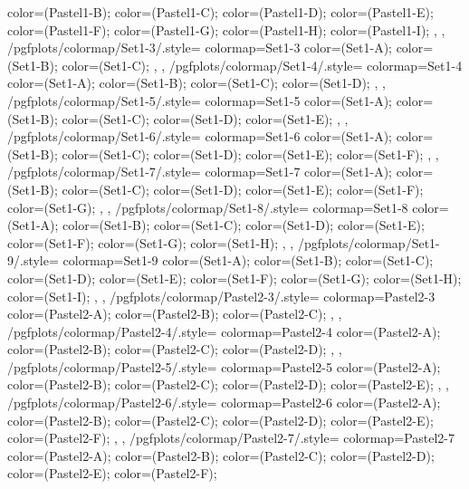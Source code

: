 {{{      color=(Pastel1-B);
      color=(Pastel1-C);
      color=(Pastel1-D);
      color=(Pastel1-E);
      color=(Pastel1-F);
      color=(Pastel1-G);
      color=(Pastel1-H);
      color=(Pastel1-I);
    },
  },
  /pgfplots/colormap/Set1-3/.style={
    colormap={Set1-3}{
      color=(Set1-A);
      color=(Set1-B);
      color=(Set1-C);
    },
  },
  /pgfplots/colormap/Set1-4/.style={
    colormap={Set1-4}{
      color=(Set1-A);
      color=(Set1-B);
      color=(Set1-C);
      color=(Set1-D);
    },
  },
  /pgfplots/colormap/Set1-5/.style={
    colormap={Set1-5}{
      color=(Set1-A);
      color=(Set1-B);
      color=(Set1-C);
      color=(Set1-D);
      color=(Set1-E);
    },
  },
  /pgfplots/colormap/Set1-6/.style={
    colormap={Set1-6}{
      color=(Set1-A);
      color=(Set1-B);
      color=(Set1-C);
      color=(Set1-D);
      color=(Set1-E);
      color=(Set1-F);
    },
  },
  /pgfplots/colormap/Set1-7/.style={
    colormap={Set1-7}{
      color=(Set1-A);
      color=(Set1-B);
      color=(Set1-C);
      color=(Set1-D);
      color=(Set1-E);
      color=(Set1-F);
      color=(Set1-G);
    },
  },
  /pgfplots/colormap/Set1-8/.style={
    colormap={Set1-8}{
      color=(Set1-A);
      color=(Set1-B);
      color=(Set1-C);
      color=(Set1-D);
      color=(Set1-E);
      color=(Set1-F);
      color=(Set1-G);
      color=(Set1-H);
    },
  },
  /pgfplots/colormap/Set1-9/.style={
    colormap={Set1-9}{
      color=(Set1-A);
      color=(Set1-B);
      color=(Set1-C);
      color=(Set1-D);
      color=(Set1-E);
      color=(Set1-F);
      color=(Set1-G);
      color=(Set1-H);
      color=(Set1-I);
    },
  },
  /pgfplots/colormap/Pastel2-3/.style={
    colormap={Pastel2-3}{
      color=(Pastel2-A);
      color=(Pastel2-B);
      color=(Pastel2-C);
    },
  },
  /pgfplots/colormap/Pastel2-4/.style={
    colormap={Pastel2-4}{
      color=(Pastel2-A);
      color=(Pastel2-B);
      color=(Pastel2-C);
      color=(Pastel2-D);
    },
  },
  /pgfplots/colormap/Pastel2-5/.style={
    colormap={Pastel2-5}{
      color=(Pastel2-A);
      color=(Pastel2-B);
      color=(Pastel2-C);
      color=(Pastel2-D);
      color=(Pastel2-E);
    },
  },
  /pgfplots/colormap/Pastel2-6/.style={
    colormap={Pastel2-6}{
      color=(Pastel2-A);
      color=(Pastel2-B);
      color=(Pastel2-C);
      color=(Pastel2-D);
      color=(Pastel2-E);
      color=(Pastel2-F);
    },
  },
  /pgfplots/colormap/Pastel2-7/.style={
    colormap={Pastel2-7}{
      color=(Pastel2-A);
      color=(Pastel2-B);
      color=(Pastel2-C);
      color=(Pastel2-D);
      color=(Pastel2-E);
      color=(Pastel2-F);
}}}
